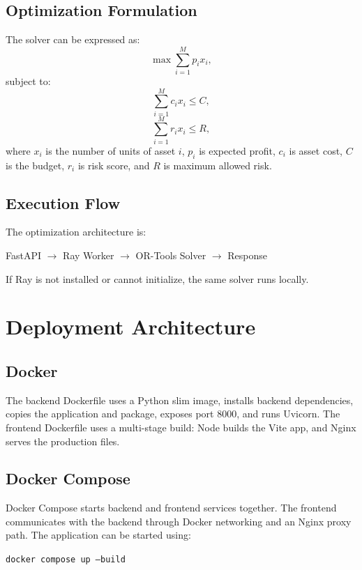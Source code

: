 \documentclass[12pt,a4paper]{report}
\begin{document}
\section{Optimization Formulation}
The solver can be expressed as:
\begin{equation}
    \max \sum_{i=1}^{M} p_i x_i,
\end{equation}
subject to:
\begin{equation}
    \sum_{i=1}^{M} c_i x_i \leq C,
\end{equation}
\begin{equation}
    \sum_{i=1}^{M} r_i x_i \leq R,
\end{equation}
where $x_i$ is the number of units of asset $i$, $p_i$ is expected profit, $c_i$ is asset cost, $C$ is the budget, $r_i$ is risk score, and $R$ is maximum allowed risk.

\section{Execution Flow}
The optimization architecture is:
\begin{center}
FastAPI $\rightarrow$ Ray Worker $\rightarrow$ OR-Tools Solver $\rightarrow$ Response
\end{center}
If Ray is not installed or cannot initialize, the same solver runs locally.

\chapter{Deployment Architecture}
\section{Docker}
The backend Dockerfile uses a Python slim image, installs backend dependencies, copies the application and package, exposes port 8000, and runs Uvicorn. The frontend Dockerfile uses a multi-stage build: Node builds the Vite app, and Nginx serves the production files.

\section{Docker Compose}
Docker Compose starts backend and frontend services together. The frontend communicates with the backend through Docker networking and an Nginx proxy path. The application can be started using:
\begin{center}
\texttt{docker compose up --build}
\end{center}
\end{document}
